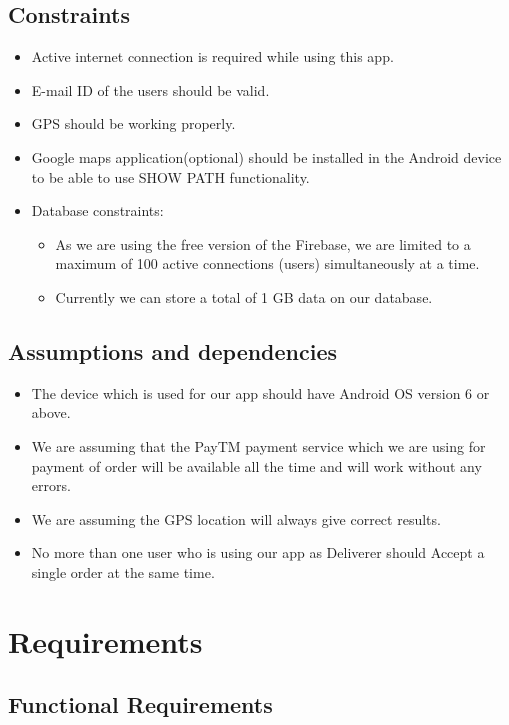 \documentclass{report}
\begin{document}
\subsection{Constraints}
\begin{itemize}
\item Active internet connection is required while using this app.
\item E-mail ID of the users should be valid.
\item GPS should be working properly.
\item Google maps application(optional) should be installed in the Android device to be able to use SHOW PATH functionality.
\item Database constraints:
\begin{itemize}
\item As we are using the free version of the Firebase, we are limited to a maximum of 100 active connections (users) simultaneously at a time.
\item Currently we can store a total of 1 GB data on our database.
\end{itemize}
\end{itemize}

\subsection{Assumptions and dependencies}

\begin{itemize}
\item The device which is used for our app should have Android OS version 6 or above. 
\item We are assuming that the PayTM payment service which we are using for payment of order will be available all the time and will work without any errors.
\item We are assuming the GPS location will always give correct results.
\item No more than one user who is using our app as Deliverer should Accept a single order at the same time.
\end{itemize}

\section{Requirements}

\subsection{Functional Requirements}
\end{document}
